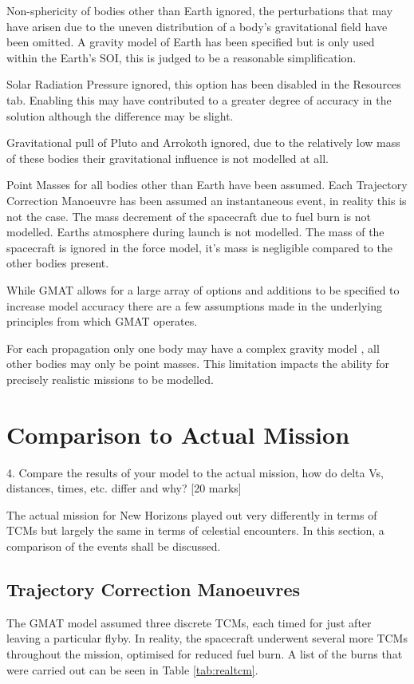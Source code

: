 \documentclass[11pt]{article}
\begin{document}
Non-sphericity of bodies other than Earth ignored, the perturbations that may have arisen due to the uneven distribution of a body's gravitational field have been omitted. A gravity model of Earth has been specified but is only used within the Earth's SOI, this is judged to be a reasonable simplification.

Solar Radiation Pressure ignored, this option has been disabled in the Resources tab. Enabling this may have contributed to a greater degree of accuracy in the solution although the difference may be slight.

Gravitational pull of Pluto and Arrokoth ignored, due to the relatively low mass of these bodies their gravitational influence is not modelled at all.

Point Masses for all bodies other than Earth have been assumed. Each Trajectory Correction Manoeuvre has been assumed an instantaneous event, in reality this is not the case. The mass decrement of the spacecraft due to fuel burn is not modelled. Earths atmosphere during launch is not modelled. The mass of the spacecraft is ignored in the force model, it's mass is negligible compared to the other bodies present.

While GMAT allows for a large array of options and additions to be specified to increase model accuracy there are a few assumptions made in the underlying principles from which GMAT operates.

For each propagation only one body may have a complex gravity model \cite{gmat}, all other bodies may only be point masses. This limitation impacts the ability for precisely realistic missions to be modelled.


\section{Comparison to Actual Mission}
4. Compare the results of your model to the actual mission, how do delta Vs, distances,
times, etc. differ and why?
[20 marks]

The actual mission for New Horizons played out very differently in terms of TCMs but largely the same in terms of celestial encounters. In this section, a comparison of the events shall be discussed.

\subsection{Trajectory Correction Manoeuvres}
The GMAT model assumed three discrete TCMs, each timed for just after leaving a particular flyby. In reality, the spacecraft underwent several more TCMs throughout the mission, optimised for reduced fuel burn. A list of the burns that were carried out can be seen in Table \ref{tab:realtcm}.
\end{document}
